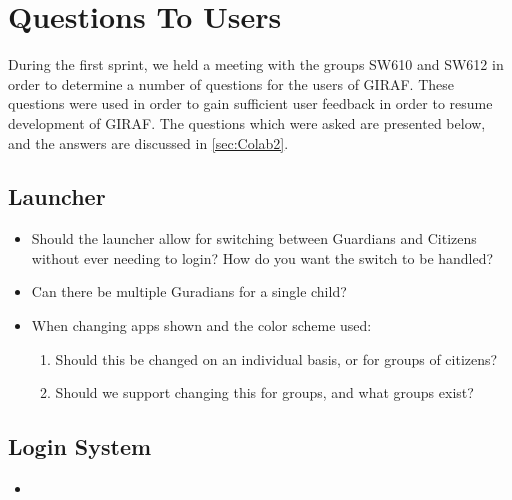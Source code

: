 \chapter{Questions To Users}
During the first sprint, we held a meeting with the groups SW610 and SW612 in
order to determine a number of questions for the users of GIRAF. These questions
were used in order to gain sufficient user feedback in order to resume
development of GIRAF. The questions which were asked are presented below, and
the answers are discussed in \autoref{sec:Colab2}.

\section{Launcher}
\begin{itemize}
  \item Should the launcher allow for switching between Guardians and Citizens
  without ever needing to login? How do you want the switch to be handled?
  \item Can there be multiple Guradians for a single child?
  \item When changing apps shown and the color scheme used:
  	\begin{enumerate}
  	\item Should this be changed on an individual basis, or for groups of
  	citizens?
  	\item Should we support changing this for groups, and what groups exist?
	\end{enumerate}
\end{itemize}

\section{Login System}
\begin{itemize}
  \item 
\end{itemize}